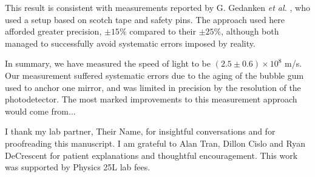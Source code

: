 \documentclass[aps,twocolumn,showpacs,preprintnumbers]{revtex4}
\begin{document}

This result is consistent with measurements reported by G. Gedanken {\it et al.} \cite{GedankenAMJPHYS12}, who used a setup based on scotch tape and safety pins.  The approach used here afforded greater precision, $\pm 15\%$ compared to their $\pm 25\%$, although both managed to successfully avoid systematic errors imposed by reality. \cite{comment}





In summary, we have measured the speed of light to be $(2.5 \pm 0.6) \times 10^8$ m/s.  
Our measurement suffered systematic errors due to the aging of the bubble gum used to anchor one mirror, and was limited in precision by the resolution of the photodetector.
The most marked improvements to this measurement approach would come from...


I thank my lab partner, Their Name, for insightful conversations and for proofreading this manuscript.  I am grateful to Alan Tran, Dillon Cislo and Ryan DeCrescent for patient explanations and thoughtful encouragement.  
This work was supported by Physics 25L lab fees.
\end{document}
